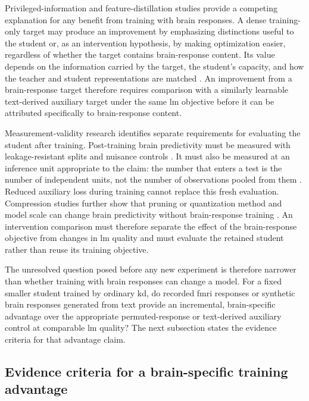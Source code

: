 Privileged-information and feature-distillation studies provide a competing explanation for any benefit from training with brain responses.
A dense training-only target may produce an improvement by emphasizing distinctions useful to the student or, as an intervention hypothesis, by making optimization easier, regardless of whether the target contains brain-response content.
Its value depends on the information carried by the target, the student's capacity, and how the teacher and student representations are matched \autocite{lopezpaz2016,saadi2025}.
An improvement from a brain-response target therefore requires comparison with a similarly learnable text-derived auxiliary target under the same \ac{lm} objective before it can be attributed specifically to brain-response content.

Measurement-validity research identifies separate requirements for evaluating the student after training.
Post-training brain predictivity must be measured with leakage-resistant splits and nuisance controls \autocite{hadidi2026,jia2026}.
It must also be measured at an inference unit appropriate to the claim: the number that enters a test is the number of independent units, not the number of observations pooled from them \autocite{lazic2010}.
Reduced auxiliary loss during training cannot replace this fresh evaluation.
Compression studies further show that pruning or quantization method and model scale can change brain predictivity without brain-response training \autocite{oota2026}.
An intervention comparison must therefore separate the effect of the brain-response objective from changes in \ac{lm} quality and must evaluate the retained student rather than reuse its training objective.

The unresolved question posed before any new experiment is therefore narrower than whether training with brain responses can change a model.
For a fixed smaller student trained by ordinary \ac{kd}, do recorded \ac{fmri} responses or synthetic brain responses generated from text provide an incremental, brain-specific advantage over the appropriate permuted-response or text-derived auxiliary control at comparable \ac{lm} quality?
The next subsection states the evidence criteria for that advantage claim.

\subsection{Evidence criteria for a brain-specific training advantage}
\label{sec:evidence-criteria}

